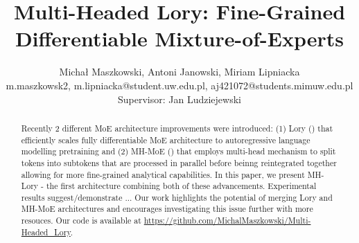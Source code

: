 \documentclass[12pt]{article}
\begin{document}
 
 
\title{Multi-Headed Lory: Fine-Grained Differentiable Mixture-of-Experts}%
\author{Michał Maszkowski, Antoni Janowski, Miriam Lipniacka\\ %
{m.maszkowsk2, m.lipniacka}@student.uw.edu.pl, aj421072@students.mimuw.edu.pl\\
Supervisor: Jan Ludziejewski}
\maketitle


\begin{center}
\begin{minipage}{0.8\textwidth}
\begin{abstract}
Recently 2 different MoE architecture improvements were introduced: (1) Lory (\cite{zhong2024lory}) that efficiently scales fully differentiable MoE architecture to autoregressive language modelling pretraining and (2) MH-MoE (\cite{wu2024multihead}) that employs multi-head mechanism to split tokens into subtokens that are processed in parallel before beinng reintegrated together allowing for more fine-grained analytical capabilities. In this paper, we present MH-Lory - the first architecture combining both of these advancements. 
Experimental results suggest/demonstrate ... Our work highlights the potential of merging Lory and MH-MoE architectures and encourages investigating this issue further with more resouces. 
Our code is available at \url{https://github.com/MichalMaszkowski/Multi-Headed_Lory}.
\end{abstract}
\end{minipage}
\end{center}
\end{document}
